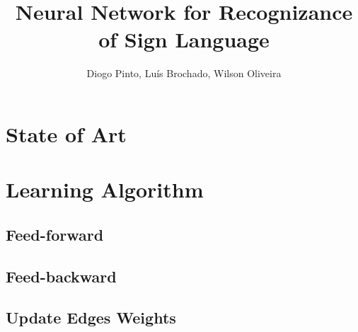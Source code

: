 \documentclass[10pt,a4paper]{article}
\author{Diogo Pinto, Luís Brochado, Wilson Oliveira}
\title{Neural Network for Recognizance of Sign Language}
\begin{document}
\maketitle

\section{State of Art}

\section{Learning Algorithm}

\subsection{Feed-forward}

\subsection{Feed-backward}

\subsection{Update Edges Weights}
\end{document}
